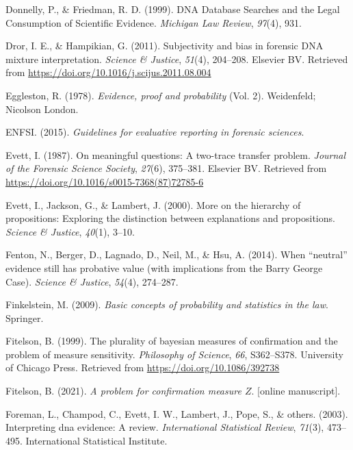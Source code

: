 \documentclass[10pt,dvipsnames,enabledeprecatedfontcommands]{scrartcl}
\begin{document}
\hypertarget{ref-donnelly1999DNADatabaseSearches}{}
Donnelly, P., \& Friedman, R. D. (1999). DNA Database Searches and the
Legal Consumption of Scientific Evidence. \emph{Michigan Law Review},
\emph{97}(4), 931.

\hypertarget{ref-Dror2011subjectivity}{}
Dror, I. E., \& Hampikian, G. (2011). Subjectivity and bias in forensic
DNA mixture interpretation. \emph{Science \& Justice}, \emph{51}(4),
204--208. Elsevier BV. Retrieved from
\url{https://doi.org/10.1016/j.scijus.2011.08.004}

\hypertarget{ref-eggleston1978evidence}{}
Eggleston, R. (1978). \emph{Evidence, proof and probability} (Vol. 2).
Weidenfeld; Nicolson London.

\hypertarget{ref-enfs2015}{}
ENFSI. (2015). \emph{Guidelines for evaluative reporting in forensic
sciences}.

\hypertarget{ref-Evett1987}{}
Evett, I. (1987). On meaningful questions: A two-trace transfer problem.
\emph{Journal of the Forensic Science Society}, \emph{27}(6), 375--381.
Elsevier BV. Retrieved from
\url{https://doi.org/10.1016/s0015-7368(87)72785-6}

\hypertarget{ref-evett2000MoreHierarchyPropositions}{}
Evett, I., Jackson, G., \& Lambert, J. (2000). More on the hierarchy of
propositions: Exploring the distinction between explanations and
propositions. \emph{Science \& Justice}, \emph{40}(1), 3--10.

\hypertarget{ref-fenton2014WhenNeutralEvidence}{}
Fenton, N., Berger, D., Lagnado, D., Neil, M., \& Hsu, A. (2014). When
``neutral'' evidence still has probative value (with implications from
the Barry George Case). \emph{Science \& Justice}, \emph{54}(4),
274--287.

\hypertarget{ref-finkelstein2009basic}{}
Finkelstein, M. (2009). \emph{Basic concepts of probability and
statistics in the law}. Springer.

\hypertarget{ref-Fitelson1999plurality}{}
Fitelson, B. (1999). The plurality of bayesian measures of confirmation
and the problem of measure sensitivity. \emph{Philosophy of Science},
\emph{66}, S362--S378. University of Chicago Press. Retrieved from
\url{https://doi.org/10.1086/392738}

\hypertarget{ref-Fitelson2021z_measure}{}
Fitelson, B. (2021). \emph{A problem for confirmation measure \(Z\)}.
{[}online manuscript{]}.

\hypertarget{ref-foreman2003interpreting}{}
Foreman, L., Champod, C., Evett, I. W., Lambert, J., Pope, S., \&
others. (2003). Interpreting dna evidence: A review. \emph{International
Statistical Review}, \emph{71}(3), 473--495. International Statistical
Institute.
\end{document}

